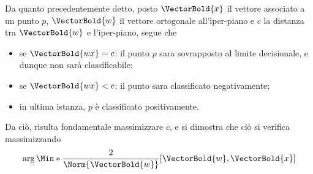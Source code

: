 \documentclass{subfiles}
\begin{document}
Da quanto precedentemente detto, posto \(\VectorBold{x}\) il vettore associato a un punto \(p\),
\(\VectorBold{w}\) il vettore ortogonale all'iper-piano e \(c\) la distanza tra \(\VectorBold{w}\) e l'iper-piano, segue che
\begin{itemize}
    \item se \(\VectorBold{wx} = c\): il punto \(p\) sara sovrapposto al limite decisionale, e dunque non sarà classificabile;
    \item se \(\VectorBold{wx} < c\): il punto sara classificato negativamente;
    \item in ultima istanza, \(p\) è classificato positivamente.
\end{itemize}
Da ciò, risulta fondamentale massimizzare \(c\), e si dimostra che ciò si verifica massimizzando
\begin{equation}
    \arg\Min*{\frac{2}{\Norm{\VectorBold{w}}}}[\VectorBold{w}, \VectorBold{x}]
\end{equation}
\end{document}
